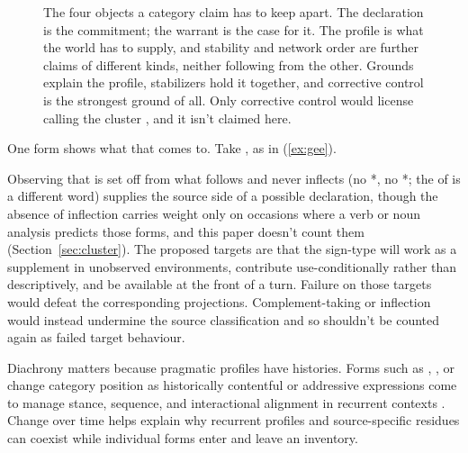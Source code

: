 \documentclass[12pt]{article}
\newcommand{\exmention}[1]{\mention{#1}}
\newcommand{\exfocus}[1]{\uline{#1}}
\begin{document}
\begin{figure}[htbp]
{%
}
\caption{The four objects a category claim has to keep apart. The
declaration is the commitment; the warrant is the case for it. The profile
is what the world has to supply, and stability and network order are further
claims of different kinds, neither following from the other. Grounds explain
the profile, stabilizers hold it together, and corrective control is the
strongest ground of all. Only corrective control would license calling the
cluster , and it isn't claimed here.}
\label{fig:four-objects}
\end{figure}

One form shows what that comes to. Take , as in
(\ref{ex:gee}).

\ea\label{ex:gee} \exmention{\exfocus{Gee}, that's a lot of money.}
\z

Observing that  is set off from what follows and never inflects
(no *, no *; the  of 
is a different word) supplies the source side of a possible declaration,
though the absence of inflection carries weight only on occasions where a
verb or noun analysis predicts those forms, and this paper doesn't count them
(Section~\ref{sec:cluster}). The proposed targets are that the sign-type will work as
a supplement in unobserved environments, contribute use-conditionally rather
than descriptively, and be available at the front of a turn. Failure on those
targets would defeat the corresponding projections. Complement-taking or
inflection would instead undermine the source classification and so shouldn't
be counted again as failed target behaviour.

Diachrony matters because pragmatic profiles have histories. Forms such
as , , or  change category
position as historically contentful or addressive expressions come to
manage stance, sequence, and interactional alignment in recurrent
contexts \citep[cf.][3--5]{juckertaavitsainen2013}. Change over time helps
explain why recurrent profiles and source-specific residues can coexist while
individual forms enter and leave an inventory.
\end{document}
